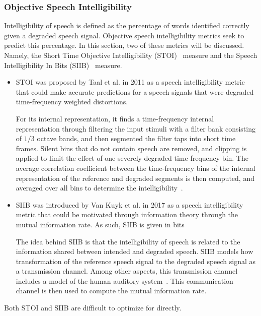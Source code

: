 \subsubsection{Objective Speech Intelligibility}
Intelligibility of speech is defined as the percentage of words identified correctly given a degraded speech signal.
Objective speech intelligibility metrics seek to predict this percentage.
In this section, two of these metrics will be discussed.
Namely, the Short Time Objective Intelligibility (STOI)~\cite{taal2011algorithm} measure and the 
Speech Intelligibility In Bits (SIIB)~\cite{van2017instrumental} measure.

\begin{itemize}
    \item 
    STOI was proposed by Taal et al. in 2011 as a speech intelligibility metric that could make accurate predictions 
    for a speech signals that were degraded time-frequency weighted distortions.

    For its internal representation, it finds a time-frequency internal representation through filtering the input stimuli with a filter bank consisting of 
    $1/3$ octave bands, and then segmented the filter taps into short time frames.
    Silent bins that do not contain speech are removed, and clipping is applied to limit the effect of one severely degraded time-frequency bin.
    The average correlation coefficient between the time-frequency bins of the internal representation of the reference and degraded 
    segments is then computed, and averaged over all bins to determine the intelligibility~\cite{taal2011algorithm}.
    \item 
    SIIB was introduced by Van Kuyk et al. in 2017 as a speech intelligibility metric that could be motivated through
    information theory through the mutual information rate.
    As such, SIIB is given in bits

    The idea behind SIIB is that the intelligibility of speech is related to the information shared between 
    intended and degraded speech.
    SIIB models how transformation of the reference speech signal to the degraded speech signal as a transmission channel.
    Among other aspects, this transmission channel includes a model of the human auditory system~\cite{van2017instrumental}.
    This communication channel is then used to compute the mutual information rate.
\end{itemize}

Both STOI and SIIB are difficult to optimize for directly. 

